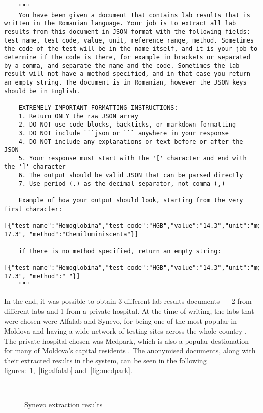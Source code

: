 \begin{lstlisting}
    """
    You have been given a document that contains lab results that is written in the Romanian language. Your job is to extract all lab results from this document in JSON format with the following fields: test_name, test_code, value, unit, reference_range, method. Sometimes the code of the test will be in the name itself, and it is your job to determine if the code is there, for example in brackets or separated by a comma, and separate the name and the code. Sometimes the lab result will not have a method specified, and in that case you return an empty string. The document is in Romanian, however the JSON keys should be in English.

    EXTREMELY IMPORTANT FORMATTING INSTRUCTIONS:
    1. Return ONLY the raw JSON array
    2. DO NOT use code blocks, backticks, or markdown formatting
    3. DO NOT include ```json or ``` anywhere in your response
    4. DO NOT include any explanations or text before or after the JSON
    5. Your response must start with the '[' character and end with the ']' character
    6. The output should be valid JSON that can be parsed directly
    7. Use period (.) as the decimal separator, not comma (,)

    Example of how your output should look, starting from the very first character:
    [{"test_name":"Hemoglobina","test_code":"HGB","value":"14.3","unit":"mg/dL","reference_range":"13.2-17.3", "method":"Chemiluminiscenta"}]

    if there is no method specified, return an empty string:
    [{"test_name":"Hemoglobina","test_code":"HGB","value":"14.3","unit":"mg/dL","reference_range":"13.2-17.3", "method":" "}]
    """
\end{lstlisting}

In the end, it was possible to obtain 3 different lab results documents --- 2 from different labs and 1 from a private hospital. At the time of writing, the labs that were chosen were Alfalab and Synevo, for being one of the most popular in Moldova and having a wide network of testing sites across the whole country \parencite{alfalab, synevo}. The private hospital chosen was Medpark, which is also a popular destionation for many of Moldova's capital residents \parencite{medpark}. The anonymised documents, along with their extracted results in the system, can be seen in the following figures:~\ref{fig:synevo},~\ref{fig:alfalab} and~\ref{fig:medpark}.

\begin{figure}[ht]
    \centering
    \\[\baselineskip]
    \caption{Synevo extraction results}\label{fig:synevo}
\end{figure}

